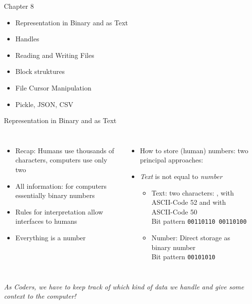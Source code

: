 \begin{frame}[fragile]{Chapter 8}
%
\begin{itemize}
\item Representation in Binary and as Text
\item Handles
\item Reading and Writing Files
\item Block struktures
\item File Cursor Manipulation
\item Pickle, JSON, CSV
\end{itemize}
%
\end{frame}


\begin{frame}[fragile]{Representation in Binary and as Text}
%
\begin{columns}[T]
\begin{itemize}
\item Recap: Humans use thousands of characters, computers use only two
\item All information: for computers essentially binary numbers
\item Rules for interpretation allow interfaces to humans
\item[\Thus] Everything is a number
\end{itemize}
%
\begin{itemize}
\item How to store (human) numbers: two principal approaches:
\item \emph{Text}  is not equal to \emph{number} 
	\begin{itemize}
	\item Text: two characters: , with ASCII-Code 52 and  with ASCII-Code 50\\
		Bit pattern \texttt{00110110 00110100}
	\item Number: Direct storage as binary number\\
		Bit pattern \texttt{00101010}
	\end{itemize}
\end{itemize}
\end{columns}
%
\begin{center}
	\begin{large}
	\Thus \emph{As Coders, we have to keep track of which kind of data we handle and give some context to the computer!}
	\end{large}
\end{center}
%
\end{frame}

